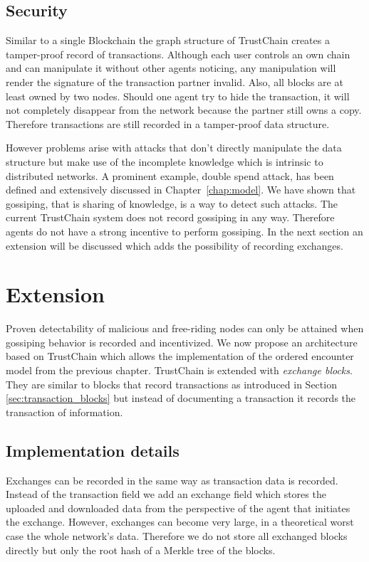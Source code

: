 \subsection{Security}
Similar to a single Blockchain the graph structure of TrustChain creates a tamper-proof record of
transactions. Although each user controls an own chain and can manipulate it without other agents 
noticing, any manipulation will render the signature of the transaction partner invalid. Also, all 
blocks are at least owned by two nodes. Should one agent try to hide the transaction, it will not 
completely disappear from the network because the partner still owns a copy. Therefore transactions
are still recorded in a tamper-proof data structure.

However problems arise with attacks that don't directly manipulate the data structure but make use 
of the incomplete knowledge which is intrinsic to distributed networks. A prominent example, 
double spend attack, has been defined and extensively discussed in Chapter~\ref{chap:model}. We have
shown that gossiping, that is sharing of knowledge, is a way to detect such attacks. The current
TrustChain system does not record gossiping in any way. Therefore agents do not have a strong 
incentive to perform gossiping. In the next section an extension will be discussed which adds the 
possibility of recording exchanges.

\section{Extension}
\label{sec:extension}
Proven detectability of malicious and free-riding nodes can only be attained when gossiping behavior
is recorded and incentivized. We now propose an architecture based on TrustChain which allows the 
implementation of the ordered encounter model from the previous chapter. TrustChain is extended with
\textit{exchange blocks}. They are similar to blocks that record transactions as introduced in 
Section \ref{sec:transaction_blocks} but instead of documenting a transaction it records the 
transaction of information.

\subsection{Implementation details}
Exchanges can be recorded in the same way as transaction data is recorded. Instead of the transaction
field we add an exchange field which stores the uploaded and downloaded data from the perspective of
the agent that initiates the exchange. However, exchanges can become very large, in a theoretical 
worst case the whole network's data. Therefore we do not store all exchanged blocks directly but only
the root hash of a Merkle tree of the blocks. 


